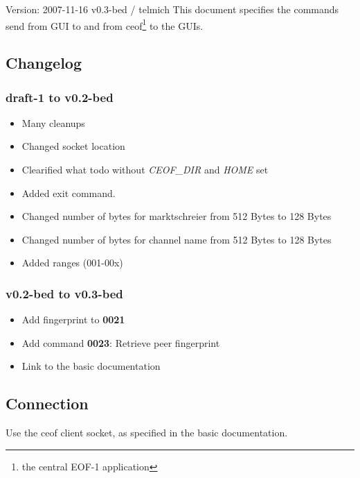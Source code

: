 \documentclass[12pt,a4paper]{book}
\begin{document}
Version: 2007-11-16 v0.3-bed / telmich
This document specifies the commands send from GUI to and from
ceof\footnote{the central EOF-1 application} to the GUIs.
\subsection{Changelog}
\subsubsection{draft-1 to v0.2-bed}
\begin{itemize}
\item Many cleanups
\item Changed socket location
\item Clearified what todo without \textit{CEOF\_DIR} and \textit{HOME} set
\item Added exit command.
\item Changed number of bytes for marktschreier from 512 Bytes to 128 Bytes
\item Changed number of bytes for channel name  from 512 Bytes to 128 Bytes
\item Added ranges (001-00x)
\end{itemize}
\subsubsection{v0.2-bed to v0.3-bed}
\begin{itemize}
\item Add fingerprint to \textbf{0021}
\item Add command \textbf{0023}: Retrieve peer fingerprint
\item Link to the basic documentation
\end{itemize}
\subsection{Connection}
Use the ceof client socket, as specified in the basic documentation.
\end{document}
